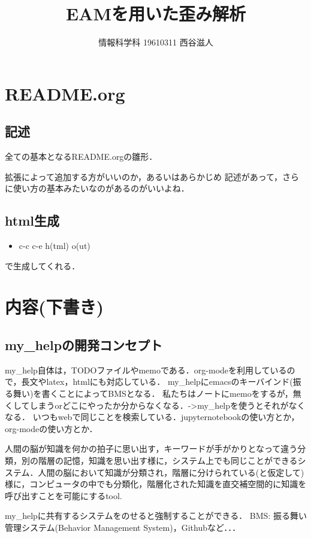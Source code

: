 \documentclass[a4j,twocolumn]{jsarticle}
\title{EAMを用いた歪み解析}
\author{情報科学科 \hspace{5mm} 19610311 \hspace{5mm} 西谷滋人}
\date{}
\begin{document}
\maketitle



\section{README.org}
\label{sec-1}
\subsection{記述}
\label{sec-1-1}
全ての基本となるREADME.orgの雛形．

拡張によって追加する方がいいのか，あるいはあらかじめ
記述があって，さらに使い方の基本みたいなのがあるのがいいよね．

\subsection{html生成}
\label{sec-1-2}
\begin{itemize}
\item c-c c-e h(tml) o(ut)
\end{itemize}
で生成してくれる．

\section{内容(下書き)}
\label{sec-2}
\subsection{my\_helpの開発コンセプト}
\label{sec-2-1}
my\_help自体は，TODOファイルやmemoである．org-modeを利用しているので，長文やlatex，htmlにも対応している．
my\_helpにemacsのキーバインド(振る舞い)を書くことによってBMSとなる．
私たちはノートにmemoをするが，無くしてしまうorどこにやったか分からなくなる．->my\_helpを使うとそれがなくなる．
いつもwebで同じことを検索している．jupyternotebookの使い方とか，org-modeの使い方とか．

人間の脳が知識を何かの拍子に思い出す，キーワードが手がかりとなって違う分類，別の階層の記憶，知識を思い出す様に，システム上でも同じことができるシステム．人間の脳において知識が分類され，階層に分けられている(と仮定して)様に，コンピュータの中でも分類化，階層化された知識を直交補空間的に知識を呼び出すことを可能にするtool.

my\_helpに共有するシステムをのせると強制することができる．
BMS: 振る舞い管理システム(Behavior Management System)，Githubなど．．．
\end{document}

